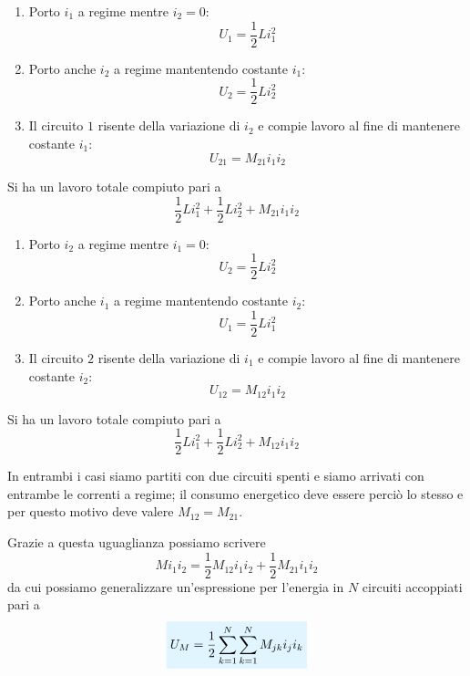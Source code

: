 \documentclass[x11names]{report}
\begin{document}
\vspace{0.5cm}
\hspace{-0.7cm}
\begin{minipage}{0.5\textwidth}
	\begin{enumerate}
		\item Porto \(i_1\) a regime mentre \(i_2 = 0\): 
		\[ U_1=\frac{1}{2}Li_1^2\]
		\item Porto anche \(i_2\) a regime mantentendo costante \(i_1\): \[U_2=\frac{1}{2}Li_2^2\]
		\item Il circuito \(1\) risente della variazione di \(i_2\) e compie lavoro al fine di mantenere costante \(i_1\):
		\[U_{21} = M_{21} i_1 i_2\]
	\end{enumerate}
	Si ha un lavoro totale compiuto pari a 
	\[
	\frac{1}{2}Li_1^2 + \frac{1}{2}Li_2^2 + M_{21} i_1 i_2
	\]
\end{minipage}
\begin{minipage}{0.5\textwidth}
	\begin{enumerate}
		\item Porto \(i_2\) a regime mentre \(i_1 = 0\): 
		\[ U_2=\frac{1}{2}Li_2^2\]
		\item Porto anche \(i_1\) a regime mantentendo costante \(i_2\): \[U_1=\frac{1}{2}Li_1^2\]
		\item Il circuito \(2\) risente della variazione di \(i_1\) e compie lavoro al fine di mantenere costante \(i_2\):
		\[U_{12} = M_{12} i_1 i_2\]
	\end{enumerate}
	Si ha un lavoro totale compiuto pari a 
	\[
	\frac{1}{2}Li_1^2 + \frac{1}{2}Li_2^2 + M_{12} i_1 i_2
	\]
\end{minipage}
\vspace{0.5cm}

\noindent
In entrambi i casi siamo partiti con due circuiti spenti e siamo arrivati con entrambe le correnti a regime; il consumo energetico deve essere perciò lo stesso e per questo motivo deve valere \(M_{12} = M_{21}\).

Grazie a questa uguaglianza possiamo scrivere
\[
Mi_1i_2 = \frac{1}{2}M_{12}i_1i_2 + \frac{1}{2}M_{21}i_1i_2 
\]
da cui possiamo generalizzare un'espressione per l'energia in \(N\) circuiti accoppiati pari a 
\begin{equation}
	\viola{U_M = \frac{1}{2}\sum_{k=1}^N\sum_{k=1}^N M_{jk}i_ji_k}
\end{equation}
\end{document}
